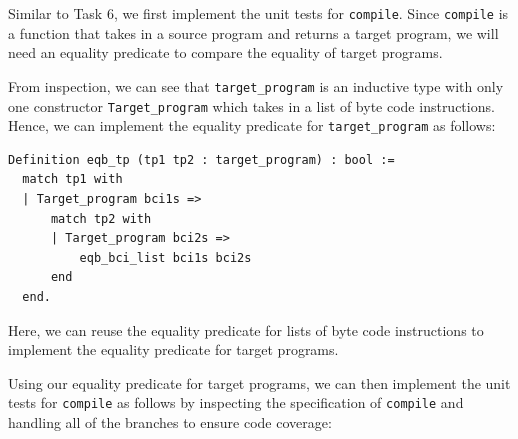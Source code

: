 \documentclass{article}
\begin{document}
Similar to Task 6, we first implement the unit tests for \texttt{compile}. Since \texttt{compile} is a function that takes in a source program and returns a target program, we will need an equality predicate to compare the equality of target programs.

From inspection, we can see that \texttt{target\_program} is an inductive type with only one constructor \texttt{Target\_program} which takes in a list of byte code instructions. Hence, we can implement the equality predicate for \texttt{target\_program} as follows:

\begin{lstlisting}
Definition eqb_tp (tp1 tp2 : target_program) : bool :=
  match tp1 with
  | Target_program bci1s =>
      match tp2 with
      | Target_program bci2s =>
          eqb_bci_list bci1s bci2s
      end
  end.
\end{lstlisting}

Here, we can reuse the equality predicate for lists of byte code instructions to implement the equality predicate for target programs.

Using our equality predicate for target programs, we can then implement the unit tests for \texttt{compile} as follows by inspecting the specification of \texttt{compile} and handling all of the branches to ensure code coverage:
\end{document}
